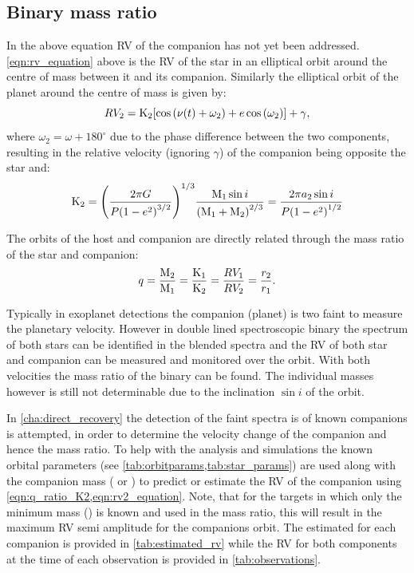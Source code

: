 \subsection{Binary mass ratio}
In the above equation RV of the companion has not yet been addressed.
\cref{eqn:rv_equation} above is the RV of the star in an elliptical orbit around the centre of mass between it and its companion. Similarly the elliptical orbit of the planet around the centre of mass is given by:
\begin{equation}
    {RV_{2}} = \textrm{K}_{2} [\cos{(\nu(t) + \omega_{2})} + e\cos{(\omega_{2})}] + \gamma, \label{eqn:rv2_equation}
\end{equation}
where \(\omega_{2} = \omega + 180^\circ\) due to the phase difference between the two components, resulting in the relative velocity (ignoring $\gamma$) of the companion being opposite the star and:
\begin{equation}
    \textrm{K}_{2}  = {\left(  \frac{2 \pi G}{P{(1 - {e}^{2})}^{3/2}} \right)}^{1/3} \frac{\textrm{M}_{1} \sin{i}}{{(\textrm{M}_{1} + \textrm{M}_{2})}^{2/3}} = \frac{2 \pi a_2 \sin{i}}{P{(1 - {e}^{2})}^{1/2}} \label{eqn:ktwo}
\end{equation}

The orbits of the host and companion are directly related through the mass ratio of the star and companion:
\begin{equation}
q = \frac{\textrm{M}_{2}}{\textrm{M}_{1}} = \frac{\textrm{K}_{1}}{\textrm{K}_{2}} = \frac{RV_{1}}{RV_{2}} = \frac{r_2}{r_1} \label{eqn:q_ratio_K2}.
\end{equation}

Typically in exoplanet detections the companion (planet) is two faint to measure the planetary velocity. However in double lined spectroscopic binary the spectrum of both stars can be identified in the blended spectra and the RV of both star and companion can be measured and monitored over the orbit. With both velocities the mass ratio of the binary can be found. The individual masses however is still not determinable due to the inclination $\sin{i}$ of the orbit.

In \cref{cha:direct_recovery} the detection of the faint spectra is of known companions is attempted, in order to determine the velocity change of the companion and hence the mass ratio. To help with the analysis and simulations the known orbital parameters (see \cref{tab:orbitparams,tab:star_params}) are used along with the companion mass (\Mtwo{} or \Mtwosini{}) to predict or estimate the RV of the companion using \cref{eqn:q_ratio_K2,eqn:rv2_equation}.
Note, that for the targets in which only the minimum mass (\Mtwosini) is known and used in the mass ratio, this will result in the maximum {RV} semi amplitude for the companions orbit.
The estimated \Ktwo{} for each companion is provided in \cref{tab:estimated_rv} while the {RV} for both components at the time of each observation is provided in \cref{tab:observations}.
